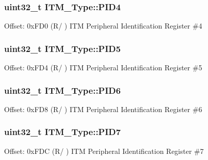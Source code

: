 \subsubsection[{\texorpdfstring{P\+I\+D4}{PID4}}]{ uint32\+\_\+t I\+T\+M\+\_\+\+Type\+::\+P\+I\+D4}\hypertarget{struct_i_t_m___type_accfc7de00b0eaba0301e8f4553f70512}{}\label{struct_i_t_m___type_accfc7de00b0eaba0301e8f4553f70512}
Offset\+: 0x\+F\+D0 (R/ ) I\+TM Peripheral Identification Register \#4 
\subsubsection[{\texorpdfstring{P\+I\+D5}{PID5}}]{ uint32\+\_\+t I\+T\+M\+\_\+\+Type\+::\+P\+I\+D5}\hypertarget{struct_i_t_m___type_a9353055ceb7024e07d59248e54502cb9}{}\label{struct_i_t_m___type_a9353055ceb7024e07d59248e54502cb9}
Offset\+: 0x\+F\+D4 (R/ ) I\+TM Peripheral Identification Register \#5 
\subsubsection[{\texorpdfstring{P\+I\+D6}{PID6}}]{ uint32\+\_\+t I\+T\+M\+\_\+\+Type\+::\+P\+I\+D6}\hypertarget{struct_i_t_m___type_a755c0ec919e7dbb5f7ff05c8b56a3383}{}\label{struct_i_t_m___type_a755c0ec919e7dbb5f7ff05c8b56a3383}
Offset\+: 0x\+F\+D8 (R/ ) I\+TM Peripheral Identification Register \#6 
\subsubsection[{\texorpdfstring{P\+I\+D7}{PID7}}]{ uint32\+\_\+t I\+T\+M\+\_\+\+Type\+::\+P\+I\+D7}\hypertarget{struct_i_t_m___type_aa31ca6bb4b749201321b23d0dbbe0704}{}\label{struct_i_t_m___type_aa31ca6bb4b749201321b23d0dbbe0704}
Offset\+: 0x\+F\+DC (R/ ) I\+TM Peripheral Identification Register \#7 
